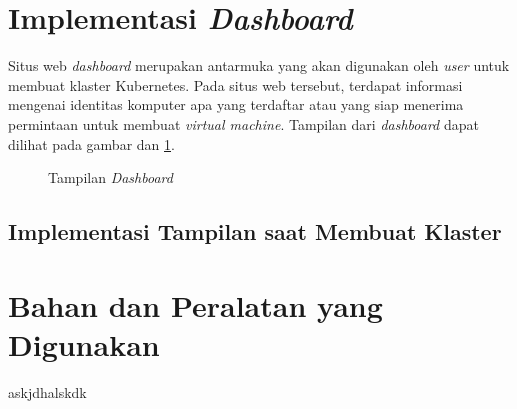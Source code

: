 \section{Implementasi \emph{Dashboard}}
\label{sec:implementas-sistem-dashboard}

Situs web \emph{dashboard} merupakan antarmuka yang akan digunakan oleh \emph{user}
untuk membuat klaster Kubernetes. Pada situs web tersebut, terdapat
informasi mengenai identitas komputer apa yang terdaftar atau yang siap
menerima permintaan untuk membuat \emph{virtual machine}.
Tampilan dari \emph{dashboard} dapat dilihat pada gambar
dan \ref{fig:dashboard-with-node}.

\begin{figure}[H]
  \centering
  \caption{Tampilan \emph{Dashboard}}
  \label{fig:dashboard-with-node}
\end{figure}

\subsection{Implementasi Tampilan saat Membuat Klaster}

\section{Bahan dan Peralatan yang Digunakan}
\label{sec:implementasi alat}

askjdhalskdk

